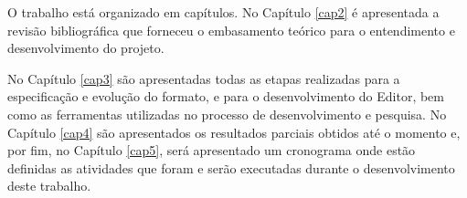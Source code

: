 O trabalho está organizado em capítulos. No Capítulo \ref{cap2} é apresentada a revisão bibliográfica que forneceu o embasamento teórico para o entendimento e desenvolvimento do projeto.

No Capítulo \ref{cap3} são apresentadas todas as etapas realizadas para a especificação e evolução do formato, e para o desenvolvimento do Editor, bem como as ferramentas utilizadas no processo de desenvolvimento e pesquisa.  No Capítulo \ref{cap4} são apresentados os resultados parciais obtidos até o momento e, por fim, no Capítulo \ref{cap5}, será apresentado um cronograma onde estão definidas as atividades que foram e serão executadas durante o desenvolvimento deste trabalho.